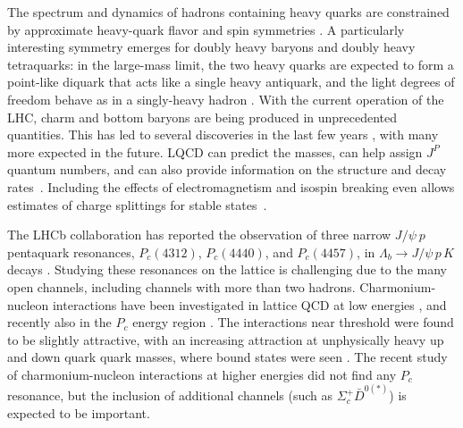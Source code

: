 The spectrum and dynamics of hadrons containing heavy quarks are constrained by approximate heavy-quark flavor and spin symmetries
\cite{Korner:1994nh,Manohar:2000dt}. A particularly interesting symmetry emerges for doubly heavy baryons and doubly heavy tetraquarks: in the large-mass limit, the two heavy quarks
are expected to form a point-like diquark that acts like a single heavy antiquark, and the light degrees of freedom behave as in a
singly-heavy hadron \cite{Carlson:1987hh,Savage:1990di,Manohar:1992nd,Brambilla:2005yk,Eichten:2017ffp}. With the current operation of the LHC, charm and bottom baryons are being produced in unprecedented quantities.
This has led to several discoveries in the last few years \cite{Chatrchyan:2012ni,Aaij:2012da,Aaij:2014yka,Aaij:2016jnn,Aaij:2017ueg,Aaij:2017vbw,Aaij:2017nav,Aaij:2018yqz,Aaij:2018tnn}, with many more expected in the future. LQCD
can predict the masses, can help assign $J^P$ quantum numbers, and can also provide information on the structure and decay rates~\cite{Brown:2014ena,Padmanath:2015jea,Bali:2015lka,Can:2015exa,Alexandrou:2016xok,Bahtiyar:2018vub,Woloshyn:2016pid,Alexandrou:2017xwd,Mathur:2018epb,Mathur:2018rwu}. Including the effects of electromagnetism and isospin breaking even allows estimates of charge splittings for stable states~\cite{Borsanyi:2014jba}.

The LHCb collaboration has reported the observation of three narrow $J/\psi\: p$ pentaquark resonances, $P_c(4312)$, $P_c(4440)$, and $P_c(4457)$, in $\Lambda_b \to J/\psi\,p\,K$ decays \cite{Aaij:2015tga,Aaij:2019vzc}.
Studying these resonances on the lattice is challenging due to the many open channels, including channels with more than two hadrons. Charmonium-nucleon
interactions have been investigated in lattice QCD at low energies \cite{Yokokawa:2006td,Liu:2008rza,Kawanai:2010ev,Beane:2014sda}, and recently also in the $P_c$ energy region \cite{Skerbis:2018lew}. The interactions near threshold were found to be slightly attractive, with an increasing attraction at unphysically heavy up and down quark quark masses, where bound states were seen \cite{Beane:2014sda}. The recent study of charmonium-nucleon interactions at higher energies \cite{Skerbis:2018lew} did not find any $P_c$ resonance, but the inclusion of additional channels (such as $\Sigma_c^+ \bar{D}^{0(*)}$) is expected to be important.




